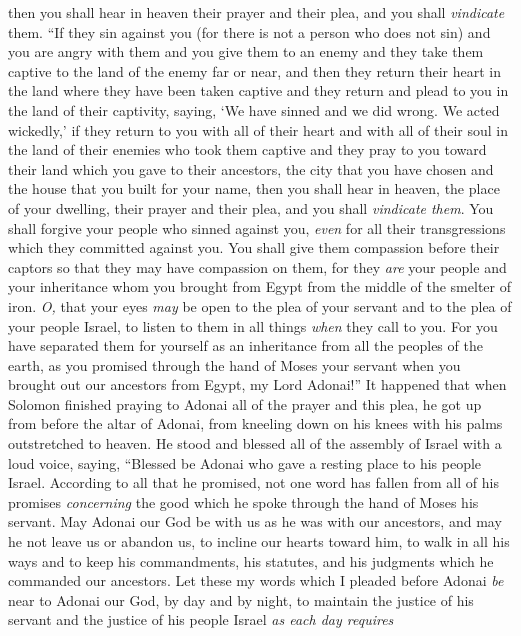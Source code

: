 \begin{biblechapter}
\verse then you shall hear in heaven their prayer and their plea, and you shall \textit{vindicate} them.
\verse “If they sin against you (for there is not a person who does not sin) and you are angry with them and you give them to an enemy and they take them captive to the land of the enemy far or near,
\verse and then they return their heart in the land where they have been taken captive and they return and plead to you in the land of their captivity, saying, ‘We have sinned and we did wrong. We acted wickedly,’
\verse if they return to you with all of their heart and with all of their soul in the land of their enemies who took them captive and they pray to you toward their land which you gave to their ancestors, the city that you have chosen and the house that you built for your name,
\verse then you shall hear in heaven, the place of your dwelling, their prayer and their plea, and you shall \textit{vindicate them}.
\verse You shall forgive your people who sinned against you, \textit{even} for all their transgressions which they committed against you. You shall give them compassion before their captors so that they may have compassion on them,
\verse for they \textit{are} your people and your inheritance whom you brought from Egypt from the middle of the smelter of iron.
\verse \textit{O,} that your eyes \textit{may} be open to the plea of your servant and to the plea of your people Israel, to listen to them in all things \textit{when} they call to you.
\verse For you have separated them for yourself as an inheritance from all the peoples of the earth, as you promised through the hand of Moses your servant when you brought out our ancestors from Egypt, my Lord Adonai!”
 It happened that when Solomon finished praying to Adonai all of the prayer and this plea, he got up from before the altar of Adonai, from kneeling down on his knees with his palms outstretched to heaven.
\verse He stood and blessed all of the assembly of Israel with a loud voice, saying,
\verse “Blessed be Adonai who gave a resting place to his people Israel. According to all that he promised, not one word has fallen from all of his promises \textit{concerning} the good which he spoke through the hand of Moses his servant.
\verse May Adonai our God be with us as he was with our ancestors, and may he not leave us or abandon us,
\verse to incline our hearts toward him, to walk in all his ways and to keep his commandments, his statutes, and his judgments which he commanded our ancestors.
\verse Let these my words which I pleaded before Adonai \textit{be} near to Adonai our God, by day and by night, to maintain the justice of his servant and the justice of his people Israel \textit{as each day requires}

\end{biblechapter}
